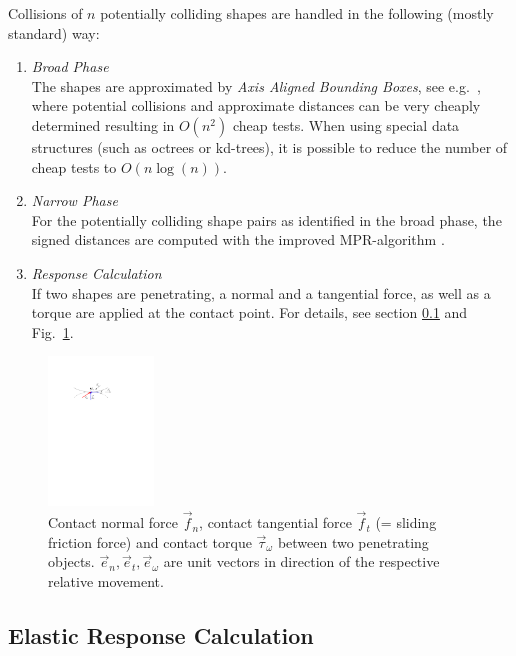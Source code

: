 Collisions of $n$ potentially colliding shapes are handled in the following (mostly standard) way:
\begin{enumerate}
	\item[1. ] \emph{Broad Phase}\\
	The shapes are approximated by \emph{Axis Aligned Bounding Boxes}, see e.g.\ \cite{bergen2003},
    where potential collisions and approximate distances can be very cheaply determined
	resulting in $O(n^2)$ cheap tests. When using special data structures (such as octrees or kd-trees),
	it is possible to reduce the number of cheap tests to $O(n \log(n))$.
	
	\item[2. ] \emph{Narrow Phase}\\
	For the potentially colliding shape pairs as identified in the broad phase,
	the signed distances are computed with the improved MPR-algorithm \cite{Neumayr2017}.
	
	\item[3. ] \emph{Response Calculation} \\
	If two shapes are penetrating, a normal and a tangential force, as well as a torque are applied at the
	contact point. For details, see section \ref{sec:responseCalculation} and 
    Fig.~\ref{fig:forces}.
\end{enumerate}
\begin{figure}[h]
	\centering
	\includegraphics[width=0.25\textwidth]{figures/forces.pdf}
	\caption{Contact normal force $\vec{f}_n$, contact tangential force $\vec{f}_t$ 
             (= sliding friction force) and contact torque $\vec{\tau}_{\omega}$
             between two penetrating objects. $\vec{e}_n, \vec{e}_t, \vec{e}_{\omega}$ are unit vectors
             in direction of the respective relative movement.}
	\label{fig:forces}
\end{figure}

\subsection{Elastic Response Calculation}\label{sec:responseCalculation}

